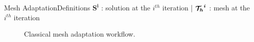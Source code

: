 \begin{frame}[noframenumbering]{Mesh Adaptation}{Definitions}
  $\boldsymbol{S^i}$ : solution at the $i^{th}$ iteration |
  $\boldsymbol{{\mathcal{T}_h}^i}$ : mesh at the $i^{th}$ iteration
  \vspace{0.5cm}
   \begin{figure}
        \caption{Classical mesh adaptation workflow.}
   \end{figure}
\end{frame}


